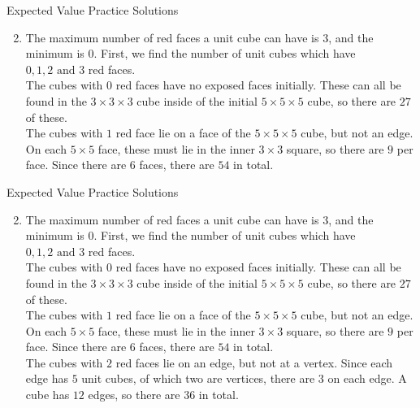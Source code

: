 \documentclass[9pt]{beamer}
\begin{document}
\begin{frame}[t]{Expected Value Practice Solutions}
    \begin{enumerate}
    \setcounter{enumi}{1}
        \item The maximum number of red faces a unit cube can have is $3$, and the minimum is $0$. First, we find the number of unit cubes which have $0,1,2\text{ and } 3$ red faces.\\
        \bigskip
        The cubes with $0$ red faces have no exposed faces initially. These can all be found in the $3\times3\times3$ cube inside of the initial $5\times5\times5$ cube, so there are $27$ of these.\\
        The cubes with $1$ red face lie on a face of the $5\times5\times5$ cube, but not an edge. On each $5\times 5$ face, these must lie in the inner $3\times 3$ square, so there are $9$ per face. Since there are $6$ faces, there are $54$ in total.\\
        
    \end{enumerate}
    
\end{frame}

\begin{frame}[t]{Expected Value Practice Solutions}
    \begin{enumerate}
    \setcounter{enumi}{1}
        \item The maximum number of red faces a unit cube can have is $3$, and the minimum is $0$. First, we find the number of unit cubes which have $0,1,2\text{ and } 3$ red faces.\\
        \bigskip
        The cubes with $0$ red faces have no exposed faces initially. These can all be found in the $3\times3\times3$ cube inside of the initial $5\times5\times5$ cube, so there are $27$ of these.\\
        The cubes with $1$ red face lie on a face of the $5\times5\times5$ cube, but not an edge. On each $5\times 5$ face, these must lie in the inner $3\times 3$ square, so there are $9$ per face. Since there are $6$ faces, there are $54$ in total.\\
        The cubes with $2$ red faces lie on an edge, but not at a vertex. Since each edge has $5$ unit cubes, of which two are vertices, there are $3$ on each edge. A cube has $12$ edges, so there are $36$ in total.\\
        
    \end{enumerate}
    
\end{frame}
\end{document}
